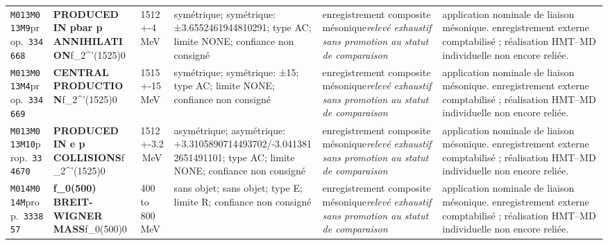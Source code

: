 \begin{landscape}
\begin{longtable}{L{1.85cm}L{4.45cm}L{2.35cm}L{4.05cm}L{3.35cm}L{7.15cm}}
\texttt{M013}\newline \texttt{M013M9}\newline prop.\ \texttt{334668} & \textbf{PRODUCED IN pbar p ANNIHILATION}\newline f\_\allowbreak{}2\textasciicircum{}'(1525)0 & 1512+-4\,MeV & symétrique; symétrique: ±3.6552461944810291; type AC; limite NONE; confiance non consigné & enregistrement composite mésonique\newline \emph{relevé exhaustif sans promotion au statut de comparaison} & application nominale de liaison mésonique. enregistrement externe comptabilisé ; réalisation HMT--MD individuelle non encore reliée. \\
\texttt{M013}\newline \texttt{M013M4}\newline prop.\ \texttt{334669} & \textbf{CENTRAL PRODUCTION}\newline f\_\allowbreak{}2\textasciicircum{}'(1525)0 & 1515+-15\,MeV & symétrique; symétrique: ±15; type AC; limite NONE; confiance non consigné & enregistrement composite mésonique\newline \emph{relevé exhaustif sans promotion au statut de comparaison} & application nominale de liaison mésonique. enregistrement externe comptabilisé ; réalisation HMT--MD individuelle non encore reliée. \\
\texttt{M013}\newline \texttt{M013M10}\newline prop.\ \texttt{334670} & \textbf{PRODUCED IN e p COLLISIONS}\newline f\_\allowbreak{}2\textasciicircum{}'(1525)0 & 1512+-3.2\,MeV & asymétrique; asymétrique: +3.3105890714493702/-3.0413812651491101; type AC; limite NONE; confiance non consigné & enregistrement composite mésonique\newline \emph{relevé exhaustif sans promotion au statut de comparaison} & application nominale de liaison mésonique. enregistrement externe comptabilisé ; réalisation HMT--MD individuelle non encore reliée. \\
\texttt{M014}\newline \texttt{M014M}\newline prop.\ \texttt{333857} & \textbf{f\_\allowbreak{}0(500) BREIT-WIGNER MASS}\newline f\_\allowbreak{}0(500)0 & 400 to 800\,MeV & sans objet; sans objet; type E; limite R; confiance non consigné & enregistrement composite mésonique\newline \emph{relevé exhaustif sans promotion au statut de comparaison} & application nominale de liaison mésonique. enregistrement externe comptabilisé ; réalisation HMT--MD individuelle non encore reliée. \\

\end{longtable}
\end{landscape}
